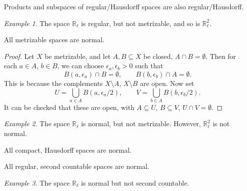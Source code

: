 \documentclass[11pt]{article}
\newcommand{\R}{\mathbb{R}}
\theoremstyle{definition}
\theoremstyle{remark}
\newtheorem*{example}{Example}
\numberwithin{equation}{section}
\begin{document}
    \begin{lemma}
        Products and subspaces of regular/Hausdorff spaces are also
        regular/Hausdorff.
    \end{lemma}
    \begin{example}
        The space $\R_\ell$ is regular, but not metrizable, and so is $\R_\ell^2$.
    \end{example}

    \begin{lemma}
        All metrizable spaces are normal.
    \end{lemma}
    \begin{proof}
        Let $X$ be metrizable, and let $A, B \subseteq X$ be closed, $A \cap B =
        \emptyset$. Then for each $a \in A$, $b \in B$, we can choose $\epsilon_a,
        \epsilon_b > 0$ such that \[
            B(a, \epsilon_a) \cap B = \emptyset, \qquad
            B(b, \epsilon_b) \cap A = \emptyset.
        \] This is because the complements $X\setminus A$, $X\setminus B$ are open.
        Now set \[
            U = \bigcup_{a \in A} B(a, \epsilon_a / 2), \qquad
            V = \bigcup_{b \in A} B(b, \epsilon_b / 2).
        \] It can be checked that these are open, with $A \subseteq U$, $B \subseteq
        V$, $U \cap V = \emptyset$.
    \end{proof}
    
    \begin{example}
        The space $\R_\ell$ is normal, but not metrizable. However, $\R_\ell^2$ is
        not normal.
    \end{example}

    \begin{theorem}
        All compact, Hausdorff spaces are normal.
    \end{theorem}

    \begin{theorem}
        All regular, second countable spaces are normal.
    \end{theorem}

    \begin{example}
        The space $\R_\ell$ is normal but not second countable.
    \end{example}
\end{document}
